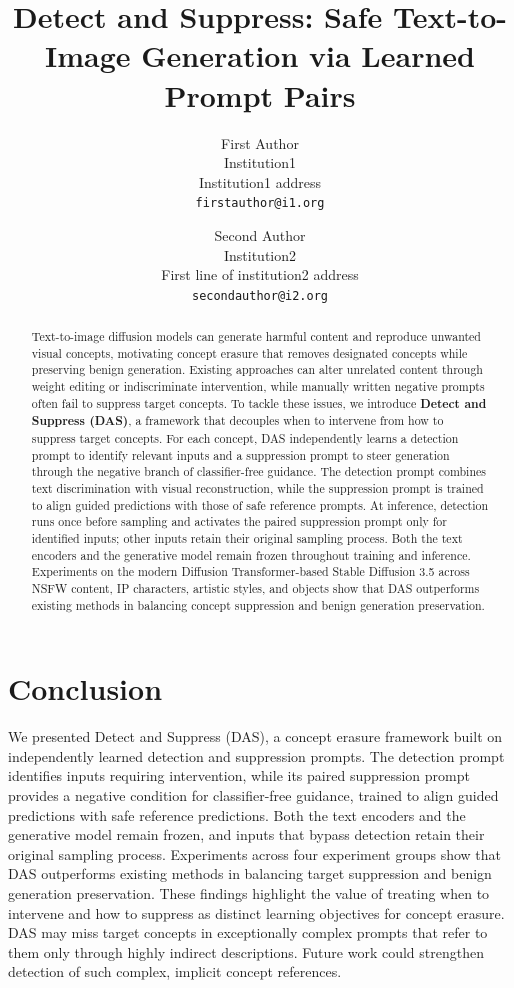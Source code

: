 \documentclass[10pt,twocolumn,letterpaper]{article}
\title{Detect and Suppress: Safe Text-to-Image Generation via Learned Prompt Pairs}
\author{First Author\\
Institution1\\
Institution1 address\\
{\tt\small firstauthor@i1.org}
\and
Second Author\\
Institution2\\
First line of institution2 address\\
{\tt\small secondauthor@i2.org}
}
\begin{document}
\maketitle

\begin{abstract}
Text-to-image diffusion models can generate harmful content and reproduce unwanted visual concepts, motivating concept erasure that removes designated concepts while preserving benign generation.
Existing approaches can alter unrelated content through weight editing or indiscriminate intervention, while manually written negative prompts often fail to suppress target concepts. To tackle these issues, 
we introduce \textbf{Detect and Suppress (DAS)}, a framework that decouples when to intervene from how to suppress target concepts.
For each concept, DAS independently learns a detection prompt to identify relevant inputs and a suppression prompt to steer generation through the negative branch of classifier-free guidance.
The detection prompt combines text discrimination with visual reconstruction, while the suppression prompt is trained to align guided predictions with those of safe reference prompts.
At inference, detection runs once before sampling and activates the paired suppression prompt only for identified inputs; other inputs retain their original sampling process.
Both the text encoders and the generative model remain frozen throughout training and inference.
Experiments on the modern Diffusion Transformer-based Stable Diffusion 3.5 across NSFW content, IP characters, artistic styles, and objects show that DAS outperforms existing methods in balancing concept suppression and benign generation preservation.
\end{abstract}






\section{Conclusion}
\label{sec:conclusion}
We presented Detect and Suppress (DAS), a concept erasure framework built on independently learned detection and suppression prompts.
The detection prompt identifies inputs requiring intervention, while its paired suppression prompt provides a negative condition for classifier-free guidance, trained to align guided predictions with safe reference predictions.
Both the text encoders and the generative model remain frozen, and inputs that bypass detection retain their original sampling process.
Experiments across four experiment groups show that DAS outperforms existing methods in balancing target suppression and benign generation preservation.
These findings highlight the value of treating when to intervene and how to suppress as distinct learning objectives for concept erasure.
DAS may miss target concepts in exceptionally complex prompts that refer to them only through highly indirect descriptions.
Future work could strengthen detection of such complex, implicit concept references.
\end{document}
